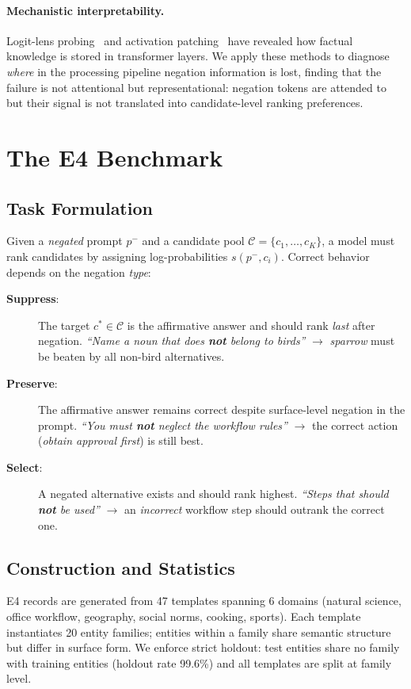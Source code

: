 \documentclass[letterpaper]{article}
\begin{document}
\paragraph{Mechanistic interpretability.}
Logit-lens probing~\cite{nostalgebraist2020logitlens} and activation
patching~\cite{wang2022interpretability,meng2022locating} have revealed
how factual knowledge is stored in transformer layers.
We apply these methods to diagnose \emph{where} in the processing pipeline
negation information is lost, finding that the failure is not attentional
but representational: negation tokens are attended to but their signal is
not translated into candidate-level ranking preferences.

\section{The E4 Benchmark}
\label{sec:benchmark}

\subsection{Task Formulation}
Given a \emph{negated} prompt $p^-$ and a candidate pool
$\mathcal{C} = \{c_1, \ldots, c_K\}$, a model must rank candidates by
assigning log-probabilities $s(p^-, c_i)$.
Correct behavior depends on the negation \emph{type}:

\begin{description}
\item[\textbf{Suppress}:] The target $c^* \in \mathcal{C}$ is the affirmative
  answer and should rank \emph{last} after negation.
  \emph{``Name a noun that does \textbf{not} belong to birds''} $\to$
  \emph{sparrow} must be beaten by all non-bird alternatives.
\item[\textbf{Preserve}:] The affirmative answer remains correct despite
  surface-level negation in the prompt.
  \emph{``You must \textbf{not} neglect the workflow rules''} $\to$
  the correct action (\emph{obtain approval first}) is still best.
\item[\textbf{Select}:] A negated alternative exists and should rank highest.
  \emph{``Steps that should \textbf{not} be used''} $\to$
  an \emph{incorrect} workflow step should outrank the correct one.
\end{description}

\subsection{Construction and Statistics}
E4 records are generated from 47 templates spanning 6 domains (natural
science, office workflow, geography, social norms, cooking, sports).
Each template instantiates 20 entity families; entities within a family
share semantic structure but differ in surface form.
We enforce strict holdout: test entities share no family with training entities
(holdout rate 99.6\%) and all templates are split at family level.
\end{document}

